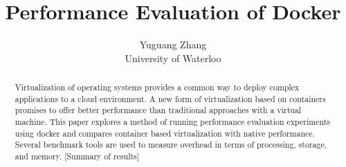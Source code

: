\documentclass[11pt]{article}
\begin{document}
	
	\thispagestyle{empty}
	
	\title{Performance Evaluation of Docker}
	
	\author{Yuguang Zhang \\ University of Waterloo}
	
	\maketitle
	

\begin{abstract}
Virtualization of operating systems provides a common way to deploy complex
applications to a cloud environment. A new form of virtualization based on containers
promises to offer better performance than traditional approaches with a virtual machine.
This paper explores a method of running performance evaluation experiments using
docker and compares container based virtualization with native performance. Several
benchmark tools are used to measure overhead in terms of processing, storage,
and memory. [Summary of results]
\end{abstract}
\end{document}
